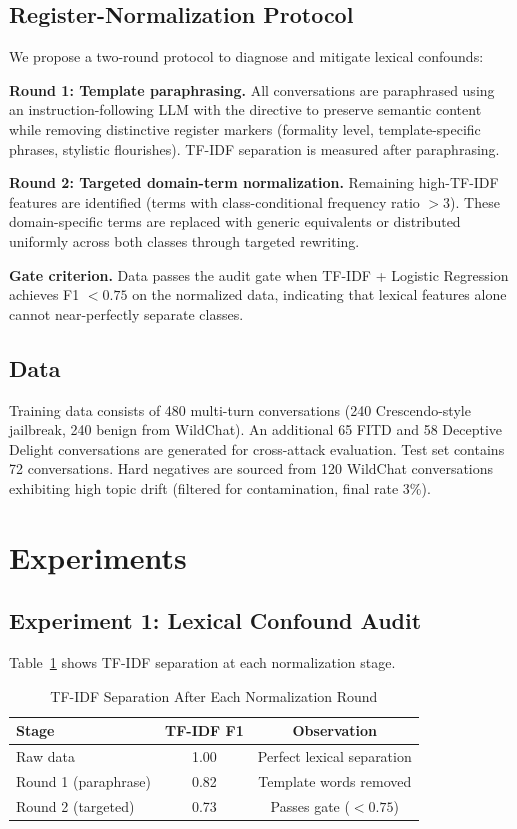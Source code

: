 \documentclass[11pt]{article}
\begin{document}
\subsection{Register-Normalization Protocol}

We propose a two-round protocol to diagnose and mitigate lexical confounds:

\textbf{Round 1: Template paraphrasing.} All conversations are paraphrased using an instruction-following LLM with the directive to preserve semantic content while removing distinctive register markers (formality level, template-specific phrases, stylistic flourishes). TF-IDF separation is measured after paraphrasing.

\textbf{Round 2: Targeted domain-term normalization.} Remaining high-TF-IDF features are identified (terms with class-conditional frequency ratio $>3$). These domain-specific terms are replaced with generic equivalents or distributed uniformly across both classes through targeted rewriting.

\textbf{Gate criterion.} Data passes the audit gate when TF-IDF + Logistic Regression achieves F1 $< 0.75$ on the normalized data, indicating that lexical features alone cannot near-perfectly separate classes.

\subsection{Data}

Training data consists of 480 multi-turn conversations (240 Crescendo-style jailbreak, 240 benign from WildChat). An additional 65 FITD and 58 Deceptive Delight conversations are generated for cross-attack evaluation. Test set contains 72 conversations. Hard negatives are sourced from 120 WildChat conversations exhibiting high topic drift (filtered for contamination, final rate 3\%).

\section{Experiments}

\subsection{Experiment 1: Lexical Confound Audit}

Table~\ref{tab:tfidf_audit} shows TF-IDF separation at each normalization stage.

\begin{table}[h]
\centering
\caption{TF-IDF Separation After Each Normalization Round}
\label{tab:tfidf_audit}
\begin{tabular}{lcc}
\toprule
\textbf{Stage} & \textbf{TF-IDF F1} & \textbf{Observation} \\
\midrule
Raw data & 1.00 & Perfect lexical separation \\
Round 1 (paraphrase) & 0.82 & Template words removed \\
Round 2 (targeted) & 0.73 & Passes gate ($<0.75$) \\
\bottomrule
\end{tabular}
\end{table}
\end{document}
